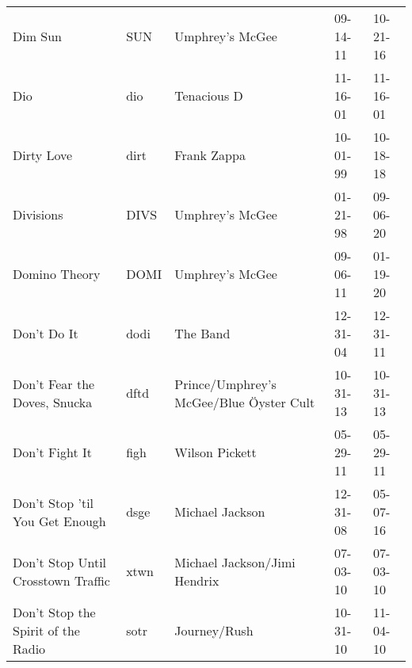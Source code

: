 \begin{longtable}{p{}p{}p{}p{}p{}}
                                                                 Dim Sun &           SUN &                                          Umphrey's McGee &              09-14-11 &             10-21-16 \\
                                                                     Dio &           dio &                                              Tenacious D &              11-16-01 &             11-16-01 \\
                                                              Dirty Love &          dirt &                                              Frank Zappa &              10-01-99 &             10-18-18 \\
                                                               Divisions &          DIVS &                                          Umphrey's McGee &              01-21-98 &             09-06-20 \\
                                                           Domino Theory &          DOMI &                                          Umphrey's McGee &              09-06-11 &             01-19-20 \\
                                                             Don't Do It &          dodi &                                                 The Band &              12-31-04 &             12-31-11 \\
                                            Don't Fear the Doves, Snucka &          dftd &                  Prince/Umphrey's McGee/Blue Öyster Cult &              10-31-13 &             10-31-13 \\
                                                          Don't Fight It &          figh &                                           Wilson Pickett &              05-29-11 &             05-29-11 \\
                                          Don't Stop 'til You Get Enough &          dsge &                                          Michael Jackson &              12-31-08 &             05-07-16 \\
                                      Don't Stop Until Crosstown Traffic &          xtwn &                             Michael Jackson/Jimi Hendrix &              07-03-10 &             07-03-10 \\
                                      Don't Stop the Spirit of the Radio &          sotr &                                             Journey/Rush &              10-31-10 &             11-04-10 \\

\end{longtable}
